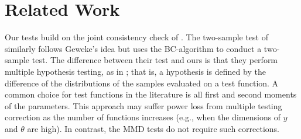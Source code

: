 \documentclass{article}
\begin{document}

\section{Related Work}
\label{related:work}

Our tests build on the joint consistency check of \cite{geweke_getting_2004}. 
The two-sample test of \cite{gandy_unit_2020} similarly follows Geweke's idea but uses the BC-algorithm to conduct a two-sample test.
The difference between their test and ours is that they perform multiple hypothesis testing, as in \citep{geweke_getting_2004}; 
that is, a hypothesis is defined by the difference of the distributions of the samples evaluated on a test function. A common choice for test functions in the literature is all first and second moments of the parameters.
This approach may suffer power loss from multiple testing correction as the number of functions increases (e.g., when the dimensions of $y$ and $\theta$ are high). 
In contrast, the MMD tests do not require such corrections.
\end{document}
